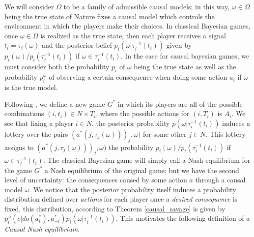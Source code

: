 \documentclass[review]{elsarticle}
\begin{document}
We will consider $\Omega$ to be a family of admissible causal models; in this way,  $\omega \in \Omega$ being the true state of Nature fixes a causal model which controls the environment in which the players make their choices. In classical Bayesian games, once $\omega \in \Omega$ is realized as the true state, then each player receives a signal $t_i=\tau_i (\omega)$ and the posterior belief $p_i(\omega | \tau^{-1}_i (t_i) )$ given by $p_i(\omega) / p_i (\tau^{-1}_i (t_i))$ if $\omega \in \tau^{-1}_i (t_i)$. In the case for causal bayesian games, we must consider both the probability $p_i$ of $\omega$ being the true state as well as the probability $p^\omega_i$ of observing a certain consequence when doing some action $a_i$ if $\omega$ is the true model.

Following \cite{osborne1994course}, we define a new game $G^\ast$ in which its players are all of the possible combinations $(i, t_i) \in N \times T_i$, where the possible actions for $(i,T_i)$ is $A_i$. We see that fixing a player $i \in N$, the posterior probability $p(\omega | \tau^{-1}_i (t_i))$ induces a lottery over the pairs $(a^\ast(j,\tau_j(\omega)))_j,\omega)$ for some other $j \in N$. This lottery assigns to $(a^\ast(j,\tau_j(\omega)))_j,\omega)$ the probability $p_i(\omega) / p_i (\tau^{-1}_i (t_i))$ if $\omega \in \tau^{-1}_i (t_i)$. The classical Bayesian game will simply call a Nash equilibrium for the game $G^\ast$ a Nash equilibrium of the original game; but we have the second level of uncertainty: the consequences caused by some action $a$ through a causal model $\omega$. We notice that the posterior probability itself induces a probability distribution defined over \textit{actions} for each player once a \textit{desired consequence} is fixed, this distribution, according to Theorem \ref{causal_savage} is given by $p^\omega_i (c | do(a^\ast_i), a^\ast_{-i}) p_i(\omega | \tau^{-1}_i (t_i))$. This motivates the following definition of a \textit{Causal Nash equilibrium}.
\end{document}
